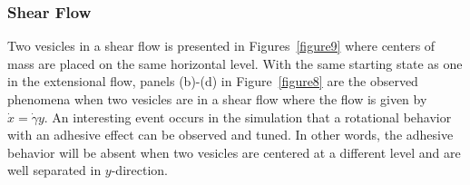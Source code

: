 \documentclass[lineno]{jfm}
\begin{document}
\subsubsection{Shear Flow}
Two vesicles in a shear flow is presented in Figures~\ref{figure9} where centers of mass are placed on the same horizontal level. With the same starting state as one in the extensional flow, panels (b)-(d) in Figure~\ref{figure8} are the observed phenomena when two vesicles are in a shear flow where the flow is given by $\dot x = \dot\gamma y$. 
An interesting event occurs in the simulation that a rotational behavior with an adhesive effect can be observed and tuned. In other words, the adhesive behavior will be absent when two vesicles are centered 
at a different level and are well separated in $y$-direction.

\end{document}
